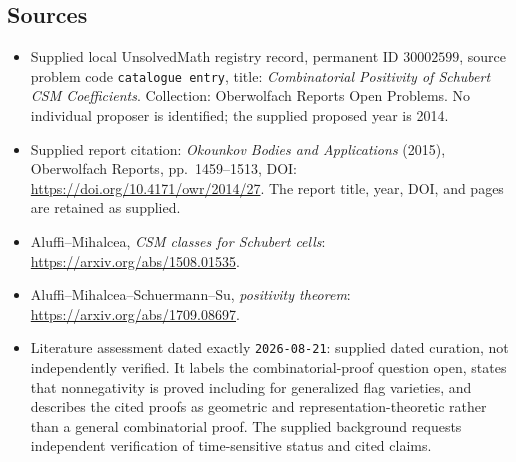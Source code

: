 \documentclass[11pt]{article}
\begin{document}
\subsection{Sources}
\begin{itemize}
\item Supplied local UnsolvedMath registry record, permanent ID \(30002599\), source problem code \texttt{catalogue entry}, title: \emph{Combinatorial Positivity of Schubert CSM Coefficients}. Collection: Oberwolfach Reports Open Problems. No individual proposer is identified; the supplied proposed year is 2014.
\item Supplied report citation: \emph{Okounkov Bodies and Applications} (2015), Oberwolfach Reports, pp.\ 1459--1513, DOI: \url{https://doi.org/10.4171/owr/2014/27}. The report title, year, DOI, and pages are retained as supplied.
\item Aluffi--Mihalcea, \emph{CSM classes for Schubert cells}: \url{https://arxiv.org/abs/1508.01535}.
\item Aluffi--Mihalcea--Schuermann--Su, \emph{positivity theorem}: \url{https://arxiv.org/abs/1709.08697}.
\item Literature assessment dated exactly \texttt{2026-08-21}: supplied dated curation, not independently verified. It labels the combinatorial-proof question open, states that nonnegativity is proved including for generalized flag varieties, and describes the cited proofs as geometric and representation-theoretic rather than a general combinatorial proof. The supplied background requests independent verification of time-sensitive status and cited claims.
\end{itemize}
\end{document}
